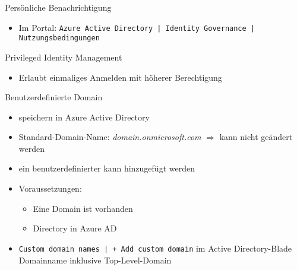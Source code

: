 \begin{flashcard}[Definition]{Persönliche Benachrichtigung}
    \begin{itemize}
        \item Im Portal:\newline
            \texttt{Azure Active Directory | Identity Governance | Nutzungsbedingungen }
    \end{itemize}
\end{flashcard}

\begin{flashcard}[Definition]{Privileged Identity Management}
    \begin{itemize}
        \item Erlaubt einmaliges Anmelden mit höherer Berechtigung
    \end{itemize}
\end{flashcard}


\begin{flashcard}[Definition]{Benutzerdefinierte Domain}
    \begin{itemize}
        \item speichern in Azure Active Directory
        \item Standard-Domain-Name: \emph{domain.onmicrosoft.com}\newline
            $\Rightarrow$ kann nicht geändert werden
        \item ein benutzerdefinierter kann hinzugefügt werden
        \item Voraussetzungen:
            \begin{itemize}
                \item Eine Domain ist vorhanden
                \item Directory in Azure AD
            \end{itemize}
        \item \texttt{Custom domain names | + Add custom domain} im Active Directory-Blade\newline
            Domainname inklusive Top-Level-Domain
    \end{itemize}
\end{flashcard}

